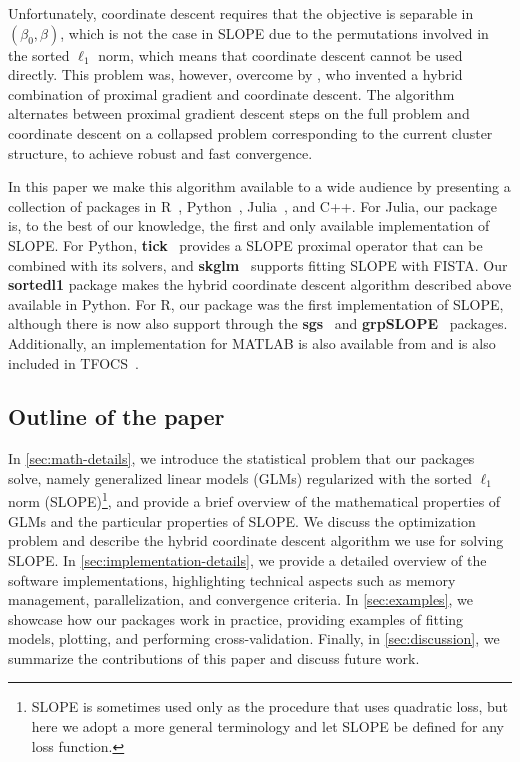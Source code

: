 \documentclass[a4paper,fleqn]{cas-sc}
\begin{document}
Unfortunately, coordinate descent requires that the objective is separable in
\((\beta_0, \beta)\), which is not the case in SLOPE due to the permutations
involved in the sorted \(\ell_1\) norm, which means that coordinate descent
cannot be used directly. This problem was, however, overcome by
\citet{larsson2023}, who invented a hybrid combination of proximal gradient and
coordinate descent. The algorithm alternates between proximal gradient descent
steps on the full problem and coordinate descent on a collapsed problem
corresponding to the current cluster structure, to achieve robust and fast
convergence.

In this paper we make this algorithm available to a wide audience by presenting
a collection of packages in \textsf{R}~\citep{rcoreteam2025},
\textsf{Python}~\citep{pythonsoftwarefoundation2025},
\textsf{Julia}~\citep{bezanson2017}, and \textsf{C++}. For \textsf{Julia}, our
package is, to the best of our knowledge, the first and only available
implementation of SLOPE\@. For \textsf{Python}, \textbf{tick}~\citep{bacry2018}
provides a SLOPE proximal operator that can be combined with its solvers, and
\textbf{skglm}~\citep{moufad2025} supports fitting SLOPE with FISTA\@. Our
\textbf{sortedl1} package makes the hybrid coordinate descent algorithm
described above available in \textsf{Python}. For \textsf{R}, our package was
the first implementation of SLOPE, although there is now also support through
the \textbf{sgs}~\citep{feser2023} and \textbf{grpSLOPE}~\citep{brzyski2018}
packages. Additionally, an implementation for \textsf{MATLAB} is also available
from \citet{candes2013} and is also included in TFOCS~\citep{becker2011}.

\subsection{Outline of the paper}

In \autoref{sec:math-details}, we introduce the statistical problem that our
packages solve, namely generalized linear models (GLMs) regularized with the
sorted \(\ell_1\) norm (SLOPE)\footnote{SLOPE is sometimes used only as the
procedure that uses quadratic loss, but here we adopt a more general terminology
and let SLOPE be defined for any loss function.}, and provide a brief overview
of the mathematical properties of GLMs and the particular properties of SLOPE.
We discuss the optimization problem and describe the hybrid coordinate descent
algorithm we use for solving SLOPE\@. In \autoref{sec:implementation-details},
we provide a detailed overview of the software implementations, highlighting
technical aspects such as memory management, parallelization, and convergence
criteria. In \autoref{sec:examples}, we showcase how our packages work in
practice, providing examples of fitting models, plotting, and performing
cross-validation. Finally, in \autoref{sec:discussion}, we summarize the
contributions of this paper and discuss future work.
\end{document}
